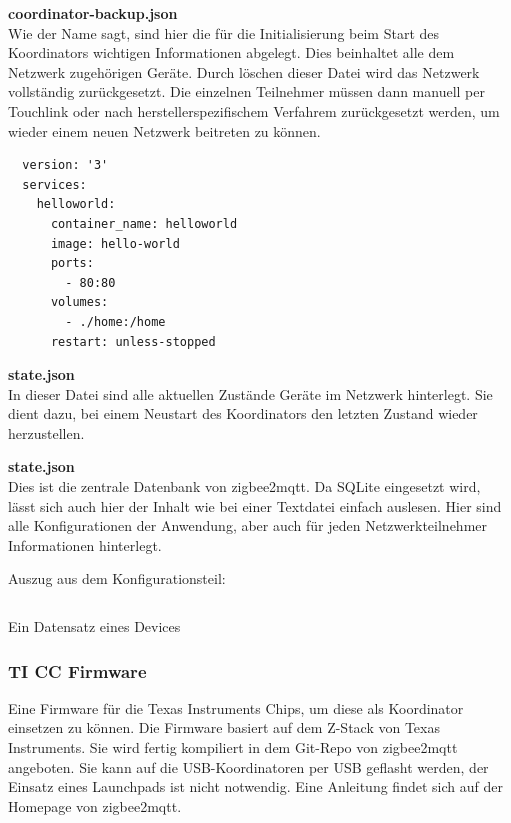 \textbf{coordinator-backup.json}\\

Wie der Name sagt, sind hier die für die Initialisierung beim Start des Koordinators wichtigen Informationen abgelegt. Dies beinhaltet alle dem Netzwerk zugehörigen Geräte.
Durch löschen dieser Datei wird das Netzwerk vollständig zurückgesetzt. Die einzelnen Teilnehmer müssen dann manuell per Touchlink oder nach herstellerspezifischem Verfahrem
zurückgesetzt werden, um wieder einem neuen Netzwerk beitreten zu können.


\begin{lstlisting}
  version: '3'
  services:
    helloworld:
      container_name: helloworld
      image: hello-world
      ports:
        - 80:80
      volumes:
        - ./home:/home
      restart: unless-stopped
  \end{lstlisting}

  \textbf{state.json}\\

  In dieser Datei sind alle aktuellen Zustände Geräte im Netzwerk hinterlegt. Sie dient dazu, bei einem Neustart des Koordinators den letzten Zustand wieder herzustellen.


  \textbf{state.json}\\

  Dies ist die zentrale Datenbank von zigbee2mqtt. Da SQLite eingesetzt wird, lässt sich auch hier der Inhalt wie bei einer Textdatei einfach auslesen. Hier sind alle
  Konfigurationen der Anwendung, aber auch für jeden Netzwerkteilnehmer Informationen hinterlegt.

  Auszug aus dem Konfigurationsteil:
  \begin{lstlisting}
  \end{lstlisting}

  Ein Datensatz eines Devices



\subsubsection{TI CC Firmware}

Eine Firmware für die Texas Instruments Chips, um diese als Koordinator einsetzen zu können. Die Firmware basiert auf dem Z-Stack von Texas Instruments. Sie wird fertig kompiliert
in dem Git-Repo von zigbee2mqtt angeboten. Sie kann auf die USB-Koordinatoren per USB geflasht werden, der Einsatz eines Launchpads ist nicht notwendig. Eine Anleitung
findet sich auf der Homepage von zigbee2mqtt.  


